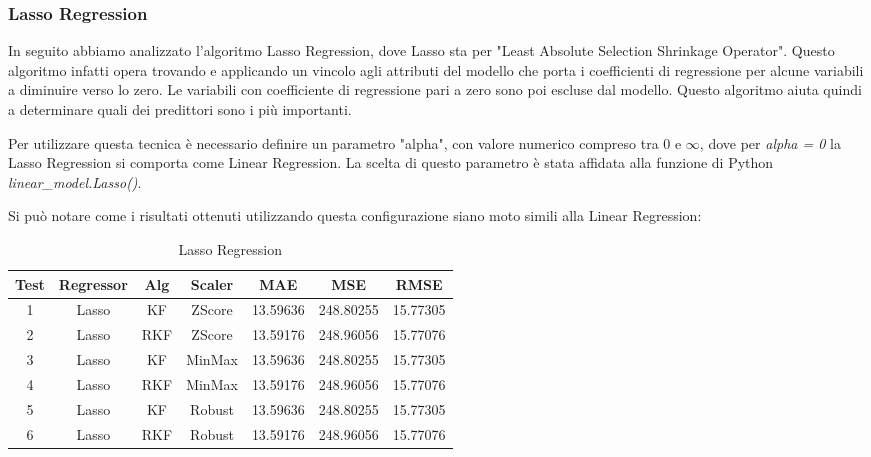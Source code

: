 \subsubsection{Lasso Regression}
\fancyhead[]{}

In seguito abbiamo analizzato l’algoritmo Lasso Regression, dove Lasso sta per "Least Absolute Selection Shrinkage Operator". Questo algoritmo infatti opera trovando e applicando un vincolo agli attributi del modello che porta i coefficienti di regressione per alcune variabili a diminuire verso lo zero. Le variabili con coefficiente di regressione pari a zero sono poi escluse dal modello. Questo algoritmo aiuta quindi a determinare quali dei predittori sono i più importanti.

Per utilizzare questa tecnica è necessario definire un parametro "alpha", con valore numerico compreso tra 0 e $\infty$, dove per \textit{alpha = 0} la Lasso Regression si comporta come Linear Regression. La scelta di questo parametro è stata affidata alla funzione di Python \textit{linear\_model.Lasso()}.

Si può notare come i risultati ottenuti utilizzando questa configurazione siano moto simili alla Linear Regression:

\begin{table}[!htbp]
    \centering
    \caption{Lasso Regression}
    \begin{tabular}{|c|c|c|c|c|c|c|}
        \hline
        Test & Regressor & Alg & Scaler & MAE & MSE & RMSE \\
        \hline
        1 & Lasso & KF & ZScore & 13.59636 & 248.80255 & 15.77305 \\
        \hline
        2 & Lasso & RKF & ZScore & 13.59176 & 248.96056 & 15.77076 \\
        \hline
        3 & Lasso & KF & MinMax & 13.59636 & 248.80255 & 15.77305 \\
        \hline
        4 & Lasso & RKF & MinMax & 13.59176 & 248.96056 & 15.77076 \\
        \hline
        5 & Lasso & KF & Robust & 13.59636 & 248.80255 & 15.77305 \\
        \hline
        6 & Lasso & RKF & Robust & 13.59176 & 248.96056 & 15.77076 \\
        \hline
    \end{tabular}
    \label{tab:random_forest}
\end{table} 

